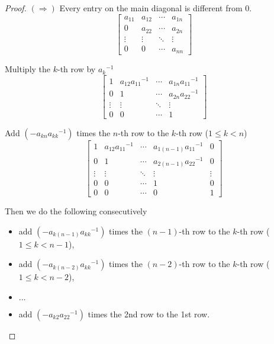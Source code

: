 \begin{proof}
    $(\Rightarrow)$ Every entry on the main diagonal is different from $0$.
    \[
        \begin{bmatrix}
            a_{11} & a_{12} & \cdots & a_{1n} \\
            0      & a_{22} & \cdots & a_{2n} \\
            \vdots & \vdots & \ddots & \vdots \\
            0      & 0      & \cdots & a_{nn}
        \end{bmatrix}
    \]

    Multiply the $k$-th row by ${a_{k}}^{-1}$
    \[
        \begin{bmatrix}
            1      & a_{12}{a_{11}}^{-1} & \cdots & a_{1n}{a_{11}}^{-1} \\
            0      & 1                   & \cdots & a_{2n}{a_{22}}^{-1} \\
            \vdots & \vdots              & \ddots & \vdots              \\
            0      & 0                   & \cdots & 1
        \end{bmatrix}
    \]

    Add $(-a_{kn}{a_{kk}}^{-1})$ times the $n$-th row to the $k$-th row ($1\le k < n$)
    \[
        \begin{bmatrix}
            1      & a_{12}{a_{11}}^{-1} & \cdots & a_{1(n-1)}{a_{11}}^{-1} & 0      \\
            0      & 1                   & \cdots & a_{2(n-1)}{a_{22}}^{-1} & 0      \\
            \vdots & \vdots              & \ddots & \vdots                  & \vdots \\
            0      & 0                   & \cdots & 1                       & 0      \\
            0      & 0                   & \cdots & 0                       & 1
        \end{bmatrix}
    \]

    Then we do the following consecutively
    \begin{itemize}
        \item add $(-a_{k(n-1)}{a_{kk}}^{-1})$ times the $(n-1)$-th row to the $k$-th row ($1\le k < n-1$),
        \item add $(-a_{k(n-2)}{a_{kk}}^{-1})$ times the $(n-2)$-th row to the $k$-th row ($1\le k < n-2$),
        \item $\ldots$
        \item add $(-a_{k2}{a_{22}}^{-1})$ times the 2nd row to the 1st row.
    \end{itemize}


\end{proof}
